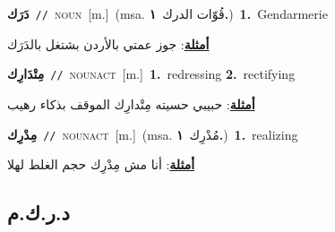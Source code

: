 \documentclass[10pt,a4paper,twoside]{article} %
\begin{document}
\begin{multicols}{2}
{\setlength\topsep{0pt}\textbf{\foreignlanguage{arabic}{دَرَك}}\ {\color{gray}\texttt{//}\color{black}}\ \textsc{noun}\ [m.]\ \color{gray}(msa. \foreignlanguage{arabic}{قُوّات الدرك}~\foreignlanguage{arabic}{\textbf{١.}})\color{black}\ \textbf{1.}~Gendarmerie\  \begin{flushright}\color{gray}\foreignlanguage{arabic}{\textbf{\underline{\foreignlanguage{arabic}{أمثلة}}}: جوز عمتي بالأردن بشتغل بالدَرَك}\end{flushright}\color{black}} \vspace{2mm}

{\setlength\topsep{0pt}\textbf{\foreignlanguage{arabic}{مِتْدَارِك}}\ {\color{gray}\texttt{//}\color{black}}\ \textsc{noun\textunderscore act}\ [m.]\ \textbf{1.}~redressing  \textbf{2.}~rectifying\  \begin{flushright}\color{gray}\foreignlanguage{arabic}{\textbf{\underline{\foreignlanguage{arabic}{أمثلة}}}: حبيبي حسيته مِتْدارِك الموقف بذكاء رهيب}\end{flushright}\color{black}} \vspace{2mm}

{\setlength\topsep{0pt}\textbf{\foreignlanguage{arabic}{مِدْرِك}}\ {\color{gray}\texttt{//}\color{black}}\ \textsc{noun\textunderscore act}\ [m.]\ \color{gray}(msa. \foreignlanguage{arabic}{مُدْرِك}~\foreignlanguage{arabic}{\textbf{١.}})\color{black}\ \textbf{1.}~realizing\  \begin{flushright}\color{gray}\foreignlanguage{arabic}{\textbf{\underline{\foreignlanguage{arabic}{أمثلة}}}: أنا مش مِدْرِك حجم الغلط لهلا}\end{flushright}\color{black}} \vspace{2mm}

\vspace{-3mm}
\subsection*{\color{blue}\foreignlanguage{arabic}{د.ر.ك.م}\color{blue}{}} 


\end{multicols}
\end{document}
